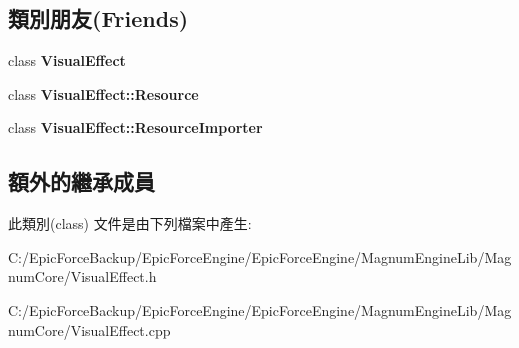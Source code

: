 \subsection*{類別朋友(Friends)}
\begin{DoxyCompactItemize}
\item 
class {\bfseries Visual\+Effect}\hypertarget{class_magnum_1_1_visual_effect_1_1_resource_importer_ad19546ee8a8868c73e6f88564fb88462}{}\label{class_magnum_1_1_visual_effect_1_1_resource_importer_ad19546ee8a8868c73e6f88564fb88462}

\item 
class {\bfseries Visual\+Effect\+::\+Resource}\hypertarget{class_magnum_1_1_visual_effect_1_1_resource_importer_a7e5f0c0359cb7300a876070f845cb939}{}\label{class_magnum_1_1_visual_effect_1_1_resource_importer_a7e5f0c0359cb7300a876070f845cb939}

\item 
class {\bfseries Visual\+Effect\+::\+Resource\+Importer}\hypertarget{class_magnum_1_1_visual_effect_1_1_resource_importer_a316a2d14e00fb787148dd7c1f760c78c}{}\label{class_magnum_1_1_visual_effect_1_1_resource_importer_a316a2d14e00fb787148dd7c1f760c78c}

\end{DoxyCompactItemize}
\subsection*{額外的繼承成員}


此類別(class) 文件是由下列檔案中產生\+:\begin{DoxyCompactItemize}
\item 
C\+:/\+Epic\+Force\+Backup/\+Epic\+Force\+Engine/\+Epic\+Force\+Engine/\+Magnum\+Engine\+Lib/\+Magnum\+Core/Visual\+Effect.\+h\item 
C\+:/\+Epic\+Force\+Backup/\+Epic\+Force\+Engine/\+Epic\+Force\+Engine/\+Magnum\+Engine\+Lib/\+Magnum\+Core/Visual\+Effect.\+cpp\end{DoxyCompactItemize}
